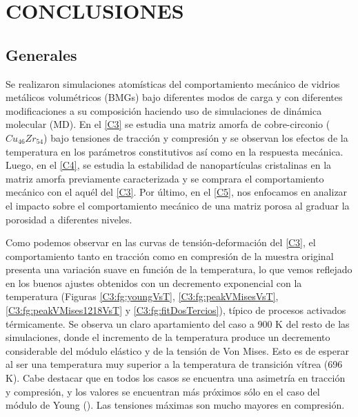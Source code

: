 
\chapter{CONCLUSIONES} %

\label{C6} %



\section{Generales}

Se realizaron simulaciones atomísticas del comportamiento mecánico de vidrios metálicos volumétricos (BMGs) bajo diferentes modos de carga y con diferentes modificaciones a su composición haciendo uso de simulaciones de dinámica molecular (MD). En el \cref{C3} se estudia una matriz amorfa de cobre-circonio ($Cu_{46}Zr_{54}$) bajo tensiones de tracción y compresión y se observan los efectos de la temperatura en los parámetros constitutivos así como en la respuesta mecánica. Luego, en el \cref{C4}, se estudia la estabilidad de nanopartículas cristalinas en la matriz amorfa previamente caracterizada y se comprara el comportamiento mecánico con el aquél del \cref{C3}. Por último, en el \cref{C5}, nos enfocamos en analizar el impacto sobre el comportamiento mecánico de una matriz porosa al graduar la porosidad a diferentes niveles.

Como podemos observar en las curvas de tensión-deformación del \cref{C3}, el comportamiento tanto en tracción como en compresión de la muestra original presenta una variación suave en función de la temperatura, lo que vemos reflejado en los buenos ajustes obtenidos con un decremento exponencial con la temperatura (Figuras \ref{C3:fg:youngVsT}, \ref{C3:fg:peakVMisesVsT}, \ref{C3:fg:peakVMises1218VsT} y \ref{C3:fg:fitDosTercios}), típico de procesos activados térmicamente. Se observa un claro apartamiento del caso a 900 K del resto de las simulaciones, donde el incremento de la temperatura produce un decremento considerable del módulo elástico y de la tensión de Von Mises. Esto es de esperar al ser una temperatura muy superior a la temperatura de transición vítrea (696 K). Cabe destacar que en todos los casos se encuentra una asimetría en tracción y compresión, y los valores se encuentran más próximos sólo en el caso del módulo de Young (). Las tensiones máximas son mucho mayores en compresión.

